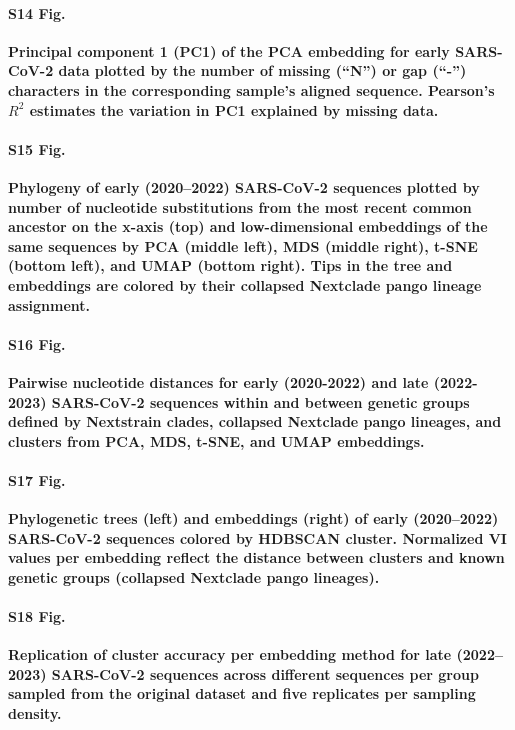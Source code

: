 \documentclass[10pt,letterpaper]{article}
\begin{document}
\paragraph*{S14 Fig.}
\label{S14_Fig_sarscov2_early_pc1_vs_bases_missing}
{\bf Principal component 1 (PC1) of the PCA embedding for early SARS-CoV-2 data plotted by the number of missing (``N'') or gap (``-'') characters in the corresponding sample's aligned sequence. Pearson's $R^{2}$ estimates the variation in PC1 explained by missing data.}

\paragraph*{S15 Fig.}
\label{S15_Fig_sarscov2_early_embeddings_by_Nextclade_pango}
{\bf Phylogeny of early (2020--2022) SARS-CoV-2 sequences plotted by number of nucleotide substitutions from the most recent common ancestor on the x-axis (top) and low-dimensional embeddings of the same sequences by PCA (middle left), MDS (middle right), t-SNE (bottom left), and UMAP (bottom right).
  Tips in the tree and embeddings are colored by their collapsed Nextclade pango lineage assignment.}

\paragraph*{S16 Fig.}
\label{S16_Fig_sarscov2_within_between_group_distances}
{\bf Pairwise nucleotide distances for early (2020-2022) and late (2022-2023) SARS-CoV-2 sequences within and between genetic groups defined by Nextstrain clades, collapsed Nextclade pango lineages, and clusters from PCA, MDS, t-SNE, and UMAP embeddings.}

\paragraph*{S17 Fig.}
\label{S17_Fig_sarscov2_early_embeddings_by_cluster_vs_Nextclade_pango}
{\bf Phylogenetic trees (left) and embeddings (right) of early (2020--2022) SARS-CoV-2 sequences colored by HDBSCAN cluster.
  Normalized VI values per embedding reflect the distance between clusters and known genetic groups (collapsed Nextclade pango lineages).}

\paragraph*{S18 Fig.}
\label{S18_Fig_late_sarscov2_replication_of_cluster_accuracy}
{\bf Replication of cluster accuracy per embedding method for late (2022--2023) SARS-CoV-2 sequences across different sequences per group sampled from the original dataset and five replicates per sampling density.}
\end{document}
